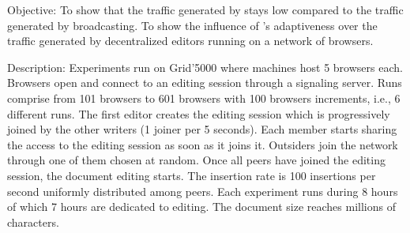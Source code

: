 \begin{asparadesc}
\item [Objective:] To show that the traffic generated by \SPRAY stays low
  compared to the traffic generated by broadcasting. To show the influence of
  \SPRAY's adaptiveness over the traffic generated by decentralized editors
  running on a network of browsers.
\item [Description:] Experiments run on Grid'5000 where machines host 5 browsers
  each. Browsers open \CRATE and connect to an editing session through a
  signaling server.  Runs comprise from 101 browsers to 601 browsers with 100
  browsers increments, i.e., 6 different runs.  The first editor creates the
  editing session which is progressively joined by the other writers (1 joiner
  per 5 seconds). Each member starts sharing the access to the editing session
  as soon as it joins it. Outsiders join the network through one of them chosen
  at random. Once all peers have joined the editing session, the document
  editing starts. The insertion rate is 100 insertions per second uniformly
  distributed among peers. Each experiment runs during 8 hours of which 7 hours
  are dedicated to editing. The document size reaches millions of characters.



\end{asparadesc}
